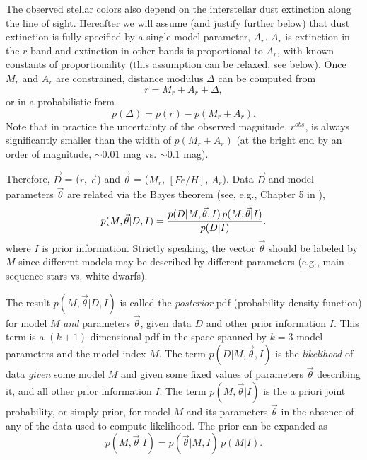 The observed stellar colors also depend on the interstellar dust extinction along the line of sight. Hereafter
we will assume (and justify further below) that dust extinction is fully specified by a single model parameter, $A_r$.
$A_r$ is extinction in the $r$ band and extinction in other bands is proportional to $A_r$, with known constants
of proportionality (this assumption can be relaxed, see below). Once $M_r$ and $A_r$ are constrained, distance
modulus $\Delta$ can be computed from
\begin{equation}
  \label{eq:distmod}
                   r = M_r + A_r + \Delta,
\end{equation}
or in a probabilistic form
\begin{equation}
  \label{eq:distmodpdf}
                       p(\Delta) = p(r) - p(M_r + A_r). 
\end{equation}
Note that in practice the uncertainty of the observed magnitude, $r^{obs}$, is always significantly smaller than
the width of $p(M_r + A_r)$ (at the bright end by an order of magnitude, $\sim$0.01 mag vs. $\sim$0.1 mag). 

 Therefore, $\vec{D}$ = ($r$, $\vec{c}$) and $\vec{\theta}$ = ($M_r$, $[Fe/H]$, $A_r$). Data $\vec{D}$ and
model parameters $\vec{\theta}$ are related via the Bayes theorem (see, e.g., Chapter 5 in \citealt{2020sdmm.book.....I}),
\begin{equation}
  \label{eq:BayesFull}
         p(M,\vec{\theta}|D,I) = {  p(D|M,\vec{\theta},I) \, p(M,\vec{\theta}|I) \over p(D|I)}.
\end{equation}
where $I$ is prior information. Strictly speaking, the vector $\vec{\theta}$
should be labeled by $M$ since different models may be described by different parameters (e.g., main-sequence
stars vs. white dwarfs).  

The result $p(M,\vec{\theta}|D,I)$ is called the {\it posterior} pdf (probability density function) for model $M$ {\it and}
parameters $\vec{\theta}$, given data $D$ and other prior information $I$. This term is a $(k+1)$-dimensional
pdf in the space spanned by $k=3$ model parameters and the model index $M$. The term $p(D|M,\vec{\theta},I)$
is the {\it likelihood} of data {\it given} some model $M$ and given some fixed values of
parameters $\vec{\theta}$ describing it, and all other prior information $I$. The term $p(M,\vec{\theta}|I)$
is the a priori joint probability, or simply prior, for model $M$ and its parameters $\vec{\theta}$ in the absence of any
of the data used to compute likelihood. The prior can be expanded as
\begin{equation}
 \label{eq:BayesPriorExpand}
        p(M,\vec{\theta}|I) = p(\vec{\theta}|M,I) \,p(M|I).
\end{equation}

